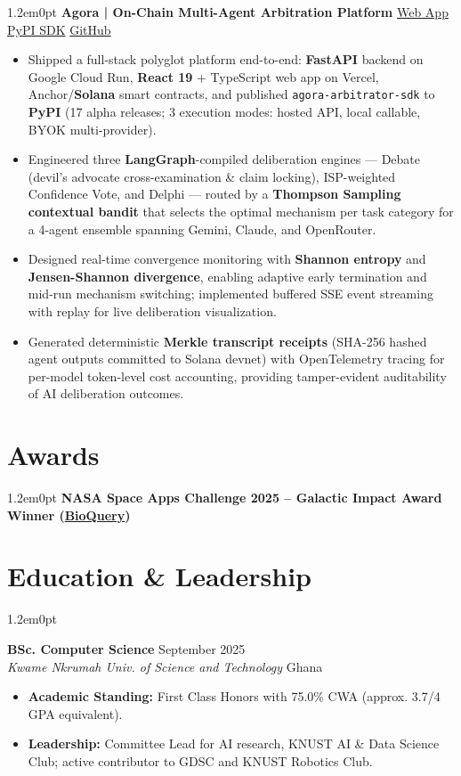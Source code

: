 \documentclass[a4paper,9pt]{extarticle}
\newenvironment{subs}
  {\begin{adjustwidth}{1.2em}{0pt}}
  {\end{adjustwidth}}
\newcommand{\entryheader}[4]{
    \noindent\textbf{#1} \hfill #2 \\
    \textit{#3} \hfill \small #4
}
\begin{document}
\begin{subs}
    \textbf{Agora | On-Chain Multi-Agent Arbitration Platform} \hfill \small\href{https://agora-bay-seven.vercel.app}{Web App} \textbar{} \href{https://pypi.org/project/agora-arbitrator-sdk/}{PyPI SDK} \textbar{} \href{https://github.com/zahemen9900/agora}{GitHub}
    \begin{itemize}
        \item Shipped a full-stack polyglot platform end-to-end: \textbf{FastAPI} backend on Google Cloud Run, \textbf{React 19} + TypeScript web app on Vercel, Anchor/\textbf{Solana} smart contracts, and published \texttt{agora-arbitrator-sdk} to \textbf{PyPI} (17 alpha releases; 3 execution modes: hosted API, local callable, BYOK multi-provider).
        \item Engineered three \textbf{LangGraph}-compiled deliberation engines --- Debate (devil's advocate cross-examination \& claim locking), ISP-weighted Confidence Vote, and Delphi --- routed by a \textbf{Thompson Sampling contextual bandit} that selects the optimal mechanism per task category for a 4-agent ensemble spanning Gemini, Claude, and OpenRouter.
        \item Designed real-time convergence monitoring with \textbf{Shannon entropy} and \textbf{Jensen-Shannon divergence}, enabling adaptive early termination and mid-run mechanism switching; implemented buffered SSE event streaming with replay for live deliberation visualization.
        \item Generated deterministic \textbf{Merkle transcript receipts} (SHA-256 hashed agent outputs committed to Solana devnet) with OpenTelemetry tracing for per-model token-level cost accounting, providing tamper-evident auditability of AI deliberation outcomes.
    \end{itemize}
\end{subs}

\section*{Awards}
\begin{subs}
\textbf{NASA Space Apps Challenge 2025 -- Galactic Impact Award Winner (\href{https://bioquery.vercel.app}{BioQuery})}
\end{subs}

\section*{Education \& Leadership}
\begin{subs}
    \entryheader{BSc. Computer Science}{September 2025}{Kwame Nkrumah Univ. of Science and Technology}{Ghana}
    \begin{itemize}
        \item \textbf{Academic Standing:} First Class Honors with 75.0\% CWA (approx. 3.7/4 GPA equivalent).
        \item \textbf{Leadership:} Committee Lead for AI research, KNUST AI \& Data Science Club; active contributor to GDSC and KNUST Robotics Club.
    \end{itemize}
\end{subs}
\end{document}
